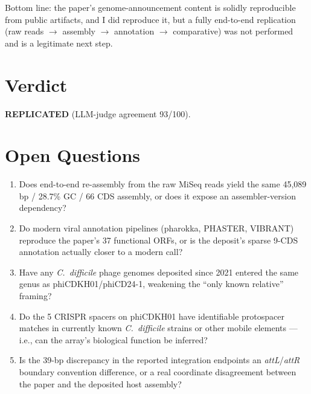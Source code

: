 \documentclass[11pt]{article}
\begin{document}
Bottom line: the paper's genome-announcement content is solidly reproducible
from public artifacts, and I did reproduce it, but a fully end-to-end
replication (raw reads $\to$ assembly $\to$ annotation $\to$ comparative)
was not performed and is a legitimate next step.

\section{Verdict}
\textbf{REPLICATED} (LLM-judge agreement 93/100).

\section{Open Questions}
\begin{enumerate}[leftmargin=1.5em]
  \item Does end-to-end re-assembly from the raw MiSeq reads yield the
        same 45{,}089 bp / 28.7\% GC / 66 CDS assembly, or does it expose
        an assembler-version dependency?
  \item Do modern viral annotation pipelines (pharokka, PHASTER, VIBRANT)
        reproduce the paper's 37 functional ORFs, or is the deposit's
        sparse 9-CDS annotation actually closer to a modern call?
  \item Have any \emph{C.\ difficile} phage genomes deposited since 2021
        entered the same genus as phiCDKH01/phiCD24-1, weakening the
        ``only known relative'' framing?
  \item Do the 5 CRISPR spacers on phiCDKH01 have identifiable protospacer
        matches in currently known \emph{C.\ difficile} strains or other
        mobile elements --- i.e., can the array's biological function be
        inferred?
  \item Is the 39-bp discrepancy in the reported integration endpoints an
        \emph{attL}/\emph{attR} boundary convention difference, or a real
        coordinate disagreement between the paper and the deposited host
        assembly?
\end{enumerate}
\end{document}
